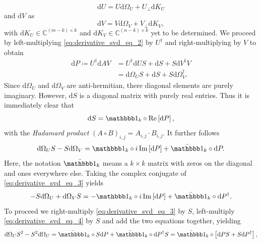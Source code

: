 \begin{equation}
	\label{eq:dOmega_U_definition}
	\text{d}U = U\text{d}\Omega_U + U_\perp\text{d}K_U
\end{equation}
and $\text{d}V$ as
\begin{equation}
	\label{eq:dOmega_V_definition}
	\text{d}V = V\text{d}\Omega_V + V_\perp\text{d}K_V,
\end{equation}
with $\text{d}K_U\in\mathbb{C}^{(m-k)\times k}$ and $\text{d}K_V\in\mathbb{C}^{(n-k)\times k}$ yet to be determined. We proceed by left-multiplying \eqref{eq:derivative_svd_eq_2} by $U^\dagger$ and right-multiplying by $V$ to obtain
\begin{equation}
	\label{eq:svd_derivative_P_definition}
	\begin{split}
		\text{d}P \coloneqq U^\dagger\text{d}AV &= U^\dagger\text{d}US + \text{d}S + S\text{d}V^\dagger V \\
		&= \text{d}\Omega_U S + \text{d}S + S\text{d}\Omega_V^\dagger.
	\end{split}
\end{equation}
Since $\text{d}\Omega_U$ and $\text{d}\Omega_V$ are anti-hermitian, there diagonal elements are purely imaginary. However, $\text{d}S$ is a diagonal matrix with purely real entries. Thus it is immediately clear that
\begin{equation}
	\label{eq:dS_final}
	\text{d}S = \id_k \circ \Re\left[\text{d}P\right],
\end{equation}
with the \textit{Hadamard product} $(A\circ B)_{i,j} = A_{i,j}\cdot B_{i,j}$. It further follows
\begin{equation}
	\label{eq:derivative_svd_eq_3}
	\text{d}\Omega_US - S\text{d}\Omega_V = \id_k\circ i\Im\left[\text{d}P\right] + \bar{\id}_k\circ\text{d}P.
\end{equation}
Here, the notation $\bar{\id}_k$ means a $k\times k$ matrix with zeros on the diagonal and ones everywhere else. Taking the complex conjugate of \eqref{eq:derivative_svd_eq_3} yields \begin{equation}
	\label{eq:derivative_svd_eq_4}
	-S\text{d}\Omega_U + \text{d}\Omega_V S = -\id_k\circ i\Im\left[\text{d}P\right] + \bar{\id}_k\circ\text{d}P^\dagger.
\end{equation}
To proceed we right-multiply \eqref{eq:derivative_svd_eq_3} by $S$, left-multiply \eqref{eq:derivative_svd_eq_4} by $S$ and add the two equations together, yielding
\begin{equation}
	\label{eq:equation_for_solving_dOmega_U}
	\text{d}\Omega_U S^2 - S^2 \text{d}\Omega_U = \bar{\id}_k\circ S\text{d}P + \bar{\id}_k\circ \text{d}P^\dagger S = \bar{\id}_k\circ\left[\text{d}PS+S\text{d}P^\dagger\right],
\end{equation}
